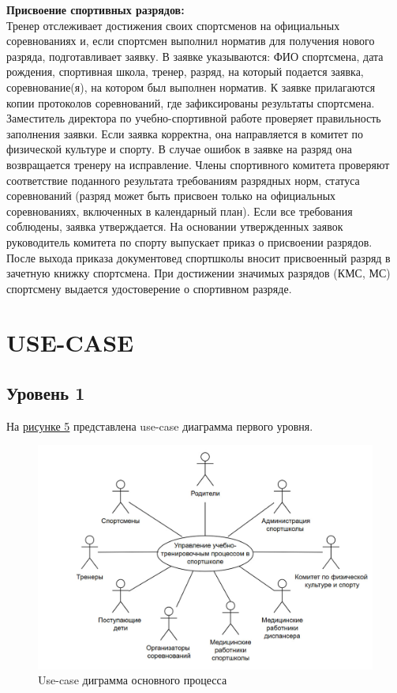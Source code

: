 \documentclass[12pt,a4paper,final]{article} %
\begin{document}
\par \textbf{Присвоение спортивных разрядов:}\\
Тренер отслеживает достижения своих спортсменов на официальных соревнованиях и, если спортсмен выполнил норматив для получения нового разряда, подготавливает заявку. В заявке указываются: ФИО спортсмена, дата рождения, спортивная школа, тренер, разряд, на который подается заявка, соревнование(я), на котором был выполнен норматив. К заявке прилагаются копии протоколов соревнований, где зафиксированы результаты спортсмена. Заместитель директора по учебно-спортивной работе проверяет правильность заполнения заявки. Если заявка корректна, она направляется в комитет по физической культуре и спорту. В случае ошибок в заявке на разряд она возвращается тренеру на исправление. Члены спортивного комитета проверяют соответствие поданного результата требованиям разрядных норм, статуса соревнований (разряд может быть присвоен только на официальных соревнованиях, включенных в календарный план). Если все требования соблюдены, заявка утверждается. На основании утвержденных заявок руководитель комитета по спорту выпускает приказ о присвоении разрядов. После выхода приказа документовед спортшколы вносит присвоенный разряд в зачетную книжку спортсмена. При достижении значимых разрядов (КМС, МС) спортсмену выдается удостоверение о спортивном разряде. 

\newpage
\section{USE-CASE}
\subsection{Уровень 1}
\par На \hyperref[fig:im5]{рисунке 5} представлена use-case диаграмма первого уровня.
\begin{figure}[h!]
	\centering
	\includegraphics[width=1.0\linewidth]{images/2}
	\caption{Use-case диграмма основного процесса}
	\label{fig:im5}
\end{figure}	
\end{document}
